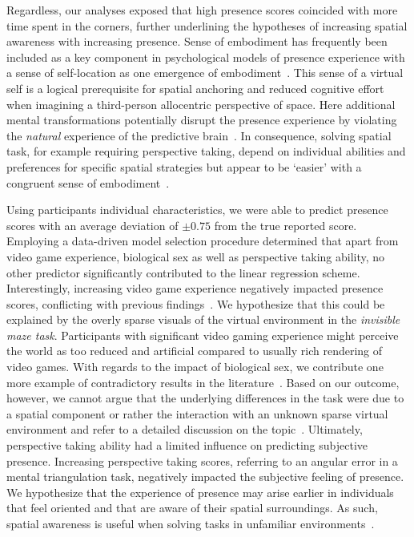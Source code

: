 Regardless, our analyses exposed that high presence scores coincided with more time spent in the corners, further underlining the hypotheses of increasing spatial awareness with increasing presence. Sense of embodiment has frequently been included as a key component in psychological models of presence experience with a sense of self-location as one emergence of embodiment~\cite{Kilteni2012}. This sense of a virtual self is a logical prerequisite for spatial anchoring and reduced cognitive effort when imagining a third-person allocentric perspective of space. Here additional mental transformations potentially disrupt the presence experience by violating the \textit{natural} experience of the predictive brain~\cite{Gonzalez-Franco2017}. In consequence, solving spatial task, for example requiring perspective taking, depend on individual abilities and preferences for specific spatial strategies but appear to be `easier' with a congruent sense of embodiment~\cite{Pan2018, Gramann2013, Gramann2005, Cognition2016, Jeung2022-lt, Gramann2021-ug, Delaux2021-ph}.

Using participants individual characteristics, we were able to predict presence scores with an average deviation of $\pm 0.75$ from the true reported score. Employing a data-driven model selection procedure determined that apart from video game experience, biological sex as well as perspective taking ability, no other predictor significantly contributed to the linear regression scheme. Interestingly, increasing video game experience negatively impacted presence scores, conflicting with previous findings~\cite{Lachlan}. We hypothesize that this could be explained by the overly sparse visuals of the virtual environment in the \textit{invisible maze task}. Participants with significant video gaming experience might perceive the world as too reduced and artificial compared to usually rich rendering of video games. With regards to the impact of biological sex, we contribute one more example of contradictory results in the literature~\cite{Coluccia2004}. Based on our outcome, however, we cannot argue that the underlying differences in the task were due to a spatial component or rather the interaction with an unknown sparse virtual environment and refer to a detailed discussion on the topic~\cite{Felnhofer}. Ultimately, perspective taking ability had a limited influence on predicting subjective presence. Increasing perspective taking scores, referring to an angular error in a mental triangulation task, negatively impacted the subjective feeling of presence. We hypothesize that the experience of presence may arise earlier in individuals that feel oriented and that are aware of their spatial surroundings. As such, spatial awareness is useful when solving tasks in unfamiliar environments~\cite{Slater2018}.


